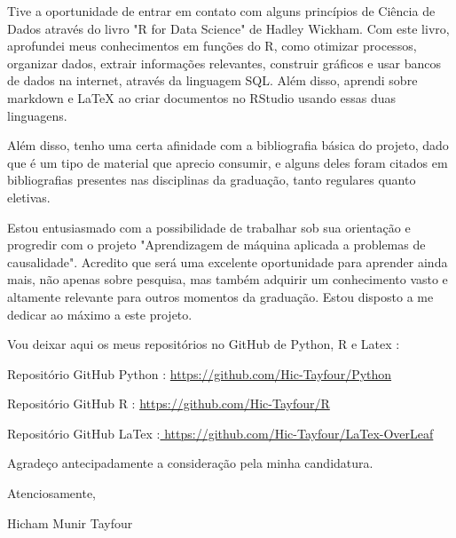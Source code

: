 \documentclass[a4paper,12pt]{article}[abntex2]
\begin{document}
Tive a oportunidade de entrar em contato com alguns princípios de Ciência de Dados através do livro "R for Data Science" de Hadley Wickham. Com este livro, aprofundei meus conhecimentos em funções do R, como otimizar processos, organizar dados, extrair informações relevantes, construir gráficos e usar bancos de dados na internet, através da linguagem SQL. Além disso, aprendi sobre markdown e LaTeX ao criar documentos no RStudio usando essas duas linguagens.

Além disso, tenho uma certa afinidade com a bibliografia básica do projeto, dado que é um tipo de material que aprecio consumir, e alguns deles foram citados em bibliografias presentes nas disciplinas da graduação, tanto regulares quanto eletivas.

Estou entusiasmado com a possibilidade de trabalhar sob sua orientação e progredir com o projeto "Aprendizagem de máquina aplicada a problemas de causalidade". Acredito que será uma excelente oportunidade para aprender ainda mais, não apenas sobre pesquisa, mas também adquirir um conhecimento vasto e altamente relevante para outros momentos da graduação. Estou disposto a me dedicar ao máximo a este projeto.

Vou deixar aqui os meus repositórios no GitHub de Python, R e Latex :

Repositório GitHub Python : \href{https://github.com/Hic-Tayfour/Python}{https://github.com/Hic-Tayfour/Python} 

Repositório GitHub R : \href{https://github.com/Hic-Tayfour/R}{https://github.com/Hic-Tayfour/R}

Repositório GitHub LaTex :\href{Repositório GitHub R : https://github.com/Hic-Tayfour/R Repositório GitHub LaTex : https://github.com/Hic-Tayfour/LaTex-OverLeaf  GitHub - Hic-Tayfour/LaTex-OverLeaf Contribute to Hic-Tayfour/LaTex-OverLeaf development by creating an account on GitHub. github.com  }{ https://github.com/Hic-Tayfour/LaTex-OverLeaf}

Agradeço antecipadamente a consideração pela minha candidatura.

Atenciosamente,

Hicham Munir Tayfour
\end{document}
